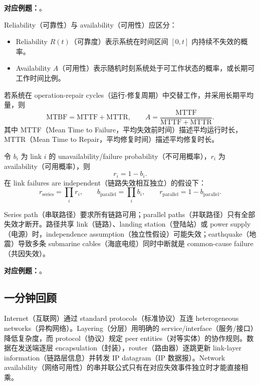 \textbf{对应例题：}。


Reliability（可靠性）与 availability（可用性）应区分：

\begin{itemize}
  \item Reliability $R(t)$（可靠度）表示系统在时间区间 $[0,t]$ 内持续不失效的概率。
  \item Availability $A$（可用性）表示随机时刻系统处于可工作状态的概率，或长期可工作时间比例。
\end{itemize}

若系统在 operation-repair cycles（运行-修复周期）中交替工作，并采用长期平均量，则
\[
  \mathrm{MTBF}=\mathrm{MTTF}+\mathrm{MTTR},
  \qquad
  A=\frac{\mathrm{MTTF}}{\mathrm{MTTF}+\mathrm{MTTR}}.
\]
其中 MTTF（Mean Time to Failure，平均失效前时间）描述平均运行时长，MTTR（Mean Time to Repair，平均修复时间）描述平均修复时长。

令 $b_i$ 为 link $i$ 的 unavailability/failure probability（不可用概率），$r_i$ 为 availability（可用概率），则
\[
  r_i=1-b_i.
\]
在 link failures are independent（链路失效相互独立）的假设下：
\[
  r_{\mathrm{series}}=\prod_i r_i,
  \qquad
  b_{\mathrm{parallel}}=\prod_i b_i,
  \qquad
  r_{\mathrm{parallel}}=1-b_{\mathrm{parallel}}.
\]

Series path（串联路径）要求所有链路可用；parallel paths（并联路径）只有全部失效才断开。路径共享 link（链路）、landing station（登陆站）或 power supply（电源）时，independence assumption（独立性假设）可能失效；earthquake（地震）导致多条 submarine cables（海底电缆）同时中断就是 common-cause failure（共因失效）。

\textbf{对应例题：}。

\subsection{一分钟回顾}

Internet（互联网）通过 standard protocols（标准协议）互连 heterogeneous networks（异构网络）。Layering（分层）用明确的 service/interface（服务/接口）降低复杂度，而 protocol（协议）规定 peer entities（对等实体）的协作规则。数据在发送端逐层 encapsulation（封装），router（路由器）逐跳更新 link-layer information（链路层信息）并转发 IP datagram（IP 数据报）。Network availability（网络可用性）的串并联公式只有在对应失效事件独立时才能直接相乘。

